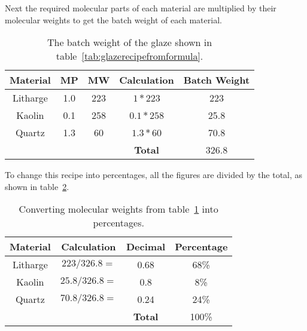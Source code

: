 Next the required molecular parts of each material are multiplied by their 
molecular weights to get the batch weight of each material.
\begin{center}
  \renewcommand{\arraystretch}{1.5}
  \begin{table}\centering
    \begin{tabular}{|c|c|c|c|c|}\hline
      \textbf{Material}&\textbf{MP}&\textbf{MW}&\textbf{Calculation}
      &\textbf{Batch Weight}\\\hline\hline
      Litharge&1.0&223&$1*223$&223\\\hline
      Kaolin&0.1&258&$0.1*258$&25.8\\\hline
      Quartz&1.3&60&$1.3*60$&70.8\\\hline\hline
      &&&\textbf{Total}&326.8\\\hline
    \end{tabular}
    \caption{The batch weight of the glaze shown in 
    table~\ref{tab:glazerecipefromformula}.}
    \label{tab:glazerecipefromformulaweights}
  \end{table}
\end{center}
To change this recipe into percentages, all the figures are divided by the 
total, as shown in table~\ref{tab:glazerecipefromformulatotal}.
\begin{center}
  \renewcommand{\arraystretch}{1.5}
  \begin{table}\centering
    \begin{tabular}{|c|c|c|c|}\hline
      \textbf{Material}&\textbf{Calculation}&\textbf{Decimal}&\textbf{Percentage}
\\\hline\hline
      Litharge&$223/326.8=$&0.68&68\%\\\hline
      Kaolin&$25.8/326.8=$&0.8&8\%\\\hline
      Quartz&$70.8/326.8=$&0.24&24\%\\\hline\hline
      &&\textbf{Total}&100\%\\\hline
    \end{tabular}
    \caption{Converting molecular weights from      
    table~\ref{tab:glazerecipefromformulaweights} into percentages.}
    \label{tab:glazerecipefromformulatotal}
  \end{table}
\end{center}
